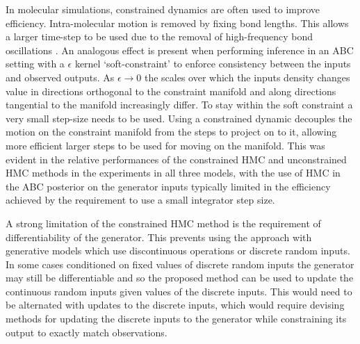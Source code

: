 In molecular simulations, constrained dynamics are often used to improve efficiency. Intra-molecular motion is removed by fixing bond lengths. This allows a larger time-step to be used due to the removal of high-frequency bond oscillations \citep{leimkuhler2016efficient}. An analogous effect is present when performing inference in an \ac{ABC} setting with a $\epsilon$ kernel `soft-constraint' to enforce consistency between the inputs and observed outputs. As $\epsilon \to 0$ the scales over which the inputs density changes value in directions orthogonal to the constraint manifold and along directions tangential to the manifold increasingly differ. To stay within the soft constraint a very small step-size needs to be used. Using a constrained dynamic decouples the motion on the constraint manifold from the steps to project on to it, allowing more efficient larger steps to be used for moving on the manifold. This was evident in the relative performances of the constrained \ac{HMC} and unconstrained \ac{HMC} methods in the experiments in all three models, with the use of \ac{HMC} in the \ac{ABC} posterior on the generator inputs typically limited in the efficiency achieved by the requirement to use a small integrator step size.

A strong limitation of the constrained \ac{HMC} method is the requirement of differentiability of the generator. This prevents using the approach with generative models which use discontinuous operations or discrete random inputs. In some cases conditioned on fixed values of discrete random inputs the generator may still be differentiable and so the proposed method can be used to update the continuous random inputs given values of the discrete inputs. This would need to be alternated with updates to the discrete inputs, which would require devising methods for updating the discrete inputs to the generator while constraining its output to exactly match observations.


